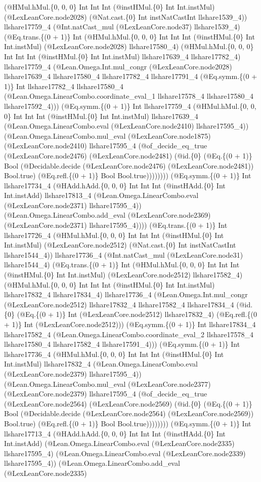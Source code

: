 \documentclass[11pt]{article}
\begin{document}
(@HMul.hMul.\{0, 0, 0\} Int Int Int (@instHMul.\{0\} Int Int.instMul) (@LexLeanCore.node2028) (@Nat.cast.\{0\} Int instNatCastInt llshare1539\_4)) llshare17759\_4 (@Int.natCast\_mul (@LexLeanCore.node37) llshare1539\_4) (@Eq.trans.\{(0 + 1)\} Int (@HMul.hMul.\{0, 0, 0\} Int Int Int (@instHMul.\{0\} Int Int.instMul) (@LexLeanCore.node2028) llshare17580\_4) (@HMul.hMul.\{0, 0, 0\} Int Int Int (@instHMul.\{0\} Int Int.instMul) llshare17639\_4 llshare17782\_4) llshare17759\_4 (@Lean.Omega.Int.mul\_congr (@LexLeanCore.node2028) llshare17639\_4 llshare17580\_4 llshare17782\_4 llshare17791\_4 (@Eq.symm.\{(0 + 1)\} Int llshare17782\_4 llshare17580\_4 (@Lean.Omega.LinearCombo.coordinate\_eval\_1 llshare17578\_4 llshare17580\_4 llshare17592\_4))) (@Eq.symm.\{(0 + 1)\} Int llshare17759\_4 (@HMul.hMul.\{0, 0, 0\} Int Int Int (@instHMul.\{0\} Int Int.instMul) llshare17639\_4 (@Lean.Omega.LinearCombo.eval (@LexLeanCore.node2410) llshare17595\_4)) (@Lean.Omega.LinearCombo.mul\_eval (@LexLeanCore.node1875) (@LexLeanCore.node2410) llshare17595\_4 (@of\_decide\_eq\_true (@LexLeanCore.node2476) (@LexLeanCore.node2481) (@id.\{0\} (@Eq.\{(0 + 1)\} Bool (@Decidable.decide (@LexLeanCore.node2476) (@LexLeanCore.node2481)) Bool.true) (@Eq.refl.\{(0 + 1)\} Bool Bool.true)))))))) (@Eq.symm.\{(0 + 1)\} Int llshare17734\_4 (@HAdd.hAdd.\{0, 0, 0\} Int Int Int (@instHAdd.\{0\} Int Int.instAdd) llshare17813\_4 (@Lean.Omega.LinearCombo.eval (@LexLeanCore.node2371) llshare17595\_4)) (@Lean.Omega.LinearCombo.add\_eval (@LexLeanCore.node2369) (@LexLeanCore.node2371) llshare17595\_4)))) (@Eq.trans.\{(0 + 1)\} Int llshare17726\_4 (@HMul.hMul.\{0, 0, 0\} Int Int Int (@instHMul.\{0\} Int Int.instMul) (@LexLeanCore.node2512) (@Nat.cast.\{0\} Int instNatCastInt llshare1544\_4)) llshare17736\_4 (@Int.natCast\_mul (@LexLeanCore.node31) llshare1544\_4) (@Eq.trans.\{(0 + 1)\} Int (@HMul.hMul.\{0, 0, 0\} Int Int Int (@instHMul.\{0\} Int Int.instMul) (@LexLeanCore.node2512) llshare17582\_4) (@HMul.hMul.\{0, 0, 0\} Int Int Int (@instHMul.\{0\} Int Int.instMul) llshare17832\_4 llshare17834\_4) llshare17736\_4 (@Lean.Omega.Int.mul\_congr (@LexLeanCore.node2512) llshare17832\_4 llshare17582\_4 llshare17834\_4 (@id.\{0\} (@Eq.\{(0 + 1)\} Int (@LexLeanCore.node2512) llshare17832\_4) (@Eq.refl.\{(0 + 1)\} Int (@LexLeanCore.node2512))) (@Eq.symm.\{(0 + 1)\} Int llshare17834\_4 llshare17582\_4 (@Lean.Omega.LinearCombo.coordinate\_eval\_2 llshare17578\_4 llshare17580\_4 llshare17582\_4 llshare17591\_4))) (@Eq.symm.\{(0 + 1)\} Int llshare17736\_4 (@HMul.hMul.\{0, 0, 0\} Int Int Int (@instHMul.\{0\} Int Int.instMul) llshare17832\_4 (@Lean.Omega.LinearCombo.eval (@LexLeanCore.node2379) llshare17595\_4)) (@Lean.Omega.LinearCombo.mul\_eval (@LexLeanCore.node2377) (@LexLeanCore.node2379) llshare17595\_4 (@of\_decide\_eq\_true (@LexLeanCore.node2564) (@LexLeanCore.node2569) (@id.\{0\} (@Eq.\{(0 + 1)\} Bool (@Decidable.decide (@LexLeanCore.node2564) (@LexLeanCore.node2569)) Bool.true) (@Eq.refl.\{(0 + 1)\} Bool Bool.true)))))))) (@Eq.symm.\{(0 + 1)\} Int llshare17713\_4 (@HAdd.hAdd.\{0, 0, 0\} Int Int Int (@instHAdd.\{0\} Int Int.instAdd) (@Lean.Omega.LinearCombo.eval (@LexLeanCore.node2335) llshare17595\_4) (@Lean.Omega.LinearCombo.eval (@LexLeanCore.node2339) llshare17595\_4)) (@Lean.Omega.LinearCombo.add\_eval (@LexLeanCore.node2335) 
\end{document}

